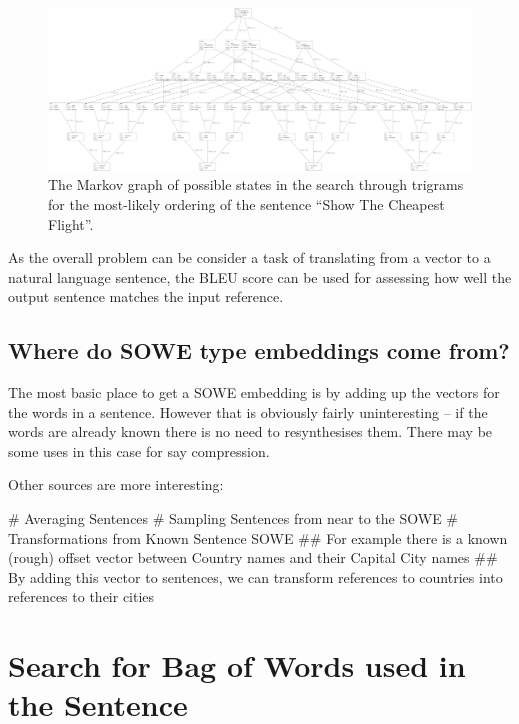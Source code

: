 \documentclass[]{scrartcl}
\numberwithin{equation}{section}
\numberwithin{figure}{section}
\theoremstyle{plain}
\theoremstyle{definition}
\begin{document}
  
\begin{figure}
	\centering 
	\includegraphics{markov_reordering2}
	\caption{The Markov graph of possible states in the search through trigrams for the most-likely ordering of the sentence ``Show The Cheapest Flight''.}
	\label{markov_diagram}
\end{figure}


As the overall problem can be consider a task of translating from a vector to a natural language sentence, the BLEU  score \parencite{Papineni2002} can be used for assessing how well the output sentence matches the input reference.




\subsection{Where do SOWE type embeddings come from?}
The most basic place to get a SOWE embedding is by adding up the vectors for the words in a sentence.
However that is obviously fairly uninteresting -- if the words are already known there is no need to resynthesises them. There may be some uses in this case for say compression.

Other sources are more interesting:

\begin{easylist}[itemize]
	# Averaging Sentences
	# Sampling Sentences from near to the SOWE
	# Transformations from Known Sentence SOWE
	## For example there is a known (rough) offset vector between Country names and their Capital City names
	## By adding this vector to sentences, we can transform references to countries into references to their cities
\end{easylist}


\section{Search for Bag of Words used in the Sentence}


\end{document}
